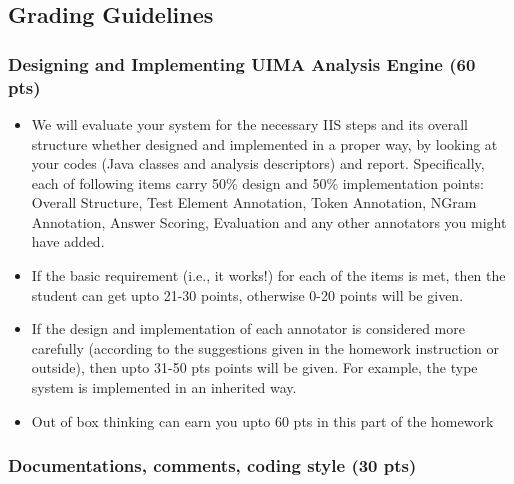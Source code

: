 
\subsection{Grading Guidelines}

\subsubsection{Designing and Implementing UIMA Analysis Engine (60 pts)}

\begin{itemize}

\item We will evaluate your system for the necessary IIS steps and its overall structure whether designed and implemented in a proper way, by looking at your
codes (Java classes and analysis descriptors) and report. 
Specifically, each of following items carry 50\% design and 50\% implementation points: 
Overall Structure, Test Element Annotation, Token Annotation, NGram Annotation, Answer Scoring, Evaluation and any other annotators you might have added.

\item If the basic requirement (i.e., it works!) for each of the items is met,
then the student can get upto 21-30 points, otherwise 0-20 points will be given.

\item If the design and implementation of each annotator is considered more carefully (according to the suggestions given in the homework instruction or outside), then upto 31-50 pts points will be given. For example, the type system is implemented in an inherited way.

\item Out of box thinking can earn you upto 60 pts in this part of the homework

\end{itemize}

\subsubsection{Documentations, comments, coding style (30 pts)}

